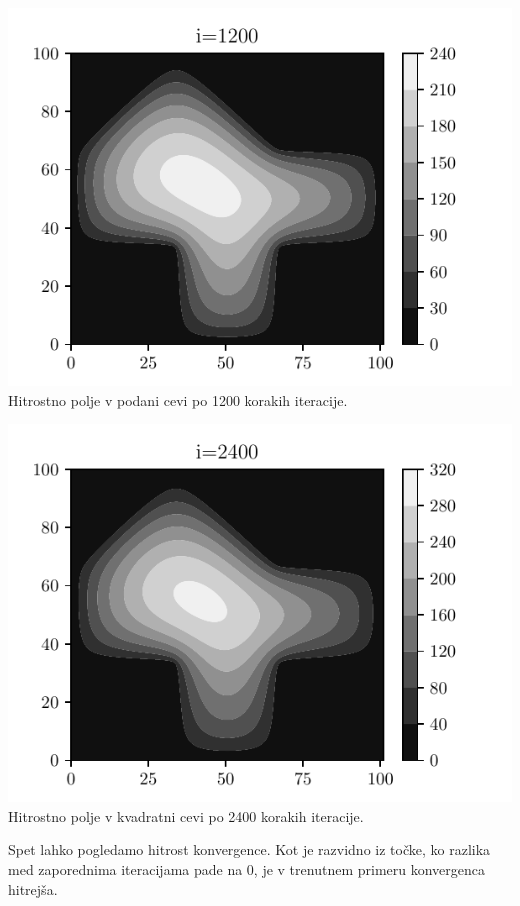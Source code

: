 \begin{center}
    \begin{minipage}{0.45\textwidth}
        \centering
    \includegraphics[width=\textwidth]{../old/1-hiska_i1200.pdf}
    {Hitrostno polje v podani cevi po 1200 korakih iteracije.}
    \end{minipage}\hfill
    \begin{minipage}{0.45\textwidth}
        \centering
        \includegraphics[width=1\textwidth]{../old/1-hiska_i2400.pdf}
    {Hitrostno polje v kvadratni cevi po 2400 korakih iteracije.}
    \end{minipage}
\end{center}
Spet lahko pogledamo hitrost konvergence. Kot je razvidno iz točke, ko razlika med zaporednima iteracijama pade na 0, je v trenutnem primeru konvergenca hitrejša.
